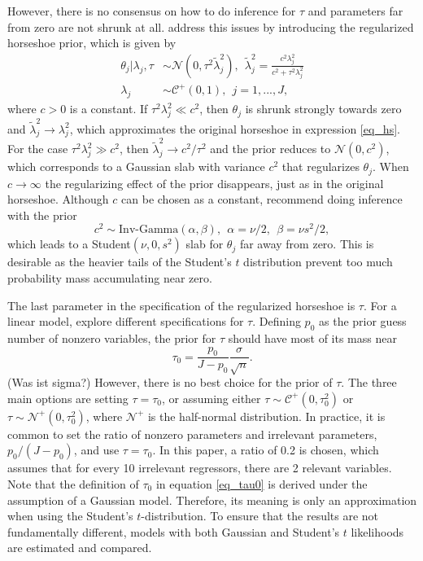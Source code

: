 However, there is no consensus on how to do inference for $\tau$ and parameters far from zero are not shrunk at all.
\cite{piironen_sparsity_2017} address this issues by introducing the regularized horseshoe prior, which is given by
\begin{equation}
    \begin{split}
        \theta_j | \lambda_j, \tau & \sim \mathcal N (0, \tau^2 \tilde \lambda^2_j),
        ~~ \tilde \lambda_j^2 = \displaystyle \frac{c^2 \lambda^2_j}{c^2 + \tau^2 \lambda_j^2}\\
        \lambda_j & \sim \mathcal C^+ (0, 1), ~~ j = 1,..., J,
    \end{split}
\end{equation}
where $c > 0$ is a constant.
If $\tau^2\lambda^2_j \ll c^2$, then $\theta_j$ is shrunk strongly towards zero and $\tilde \lambda^2_j \rightarrow \lambda^2_j$, which approximates the original horseshoe in expression \ref{eq_hs}.
For the case $\tau^2\lambda^2_j \gg c^2$, then $\tilde \lambda^2_j \rightarrow c^2/\tau^2$ and the prior reduces to $\mathcal N(0, c^2)$, which corresponds to a Gaussian slab with variance $c^2$ that regularizes $\theta_j$.
When $c \rightarrow \infty$ the regularizing effect of the prior disappears, just as in the original horseshoe.
Although $c$ can be chosen as a constant, \cite{piironen_sparsity_2017} recommend doing inference with the prior
\begin{equation*}
    c^2 \sim \text{Inv-Gamma}(\alpha, \beta), ~~ \alpha = \nu/2, ~~ \beta = \nu s^2/2,
\end{equation*}
which leads to a Student$(\nu, 0, s^2)$ slab for $\theta_j$ far away from zero.
This is desirable as the heavier tails of the Student's $t$ distribution prevent too much probability mass accumulating near zero.

The last parameter in the specification of the regularized horseshoe is $\tau$.
For a linear model, \cite{piironen_sparsity_2017} explore different specifications for $\tau$.
Defining $p_0$ as the prior guess number of nonzero variables, the prior for $\tau$ should have most of its mass near
\begin{equation}
    \displaystyle \tau_0 = \frac{p_0}{J-p_0}\frac{\sigma}{\sqrt n}.
    \label{eq_tau0}
\end{equation}
(Was ist sigma?)
However, there is no best choice for the prior of $\tau$. The three main options are setting $\tau = \tau_0$, or assuming either $\tau \sim \mathcal C^+(0, \tau_0^2)$ or $\tau \sim \mathcal N^+(0, \tau_0^2)$, where $\mathcal{N^+}$ is the half-normal distribution.
In practice, it is common to set the ratio of nonzero parameters and irrelevant parameters, $p_0/(J - p_0)$, and use $\tau = \tau_0$.
In this paper, a ratio of 0.2 is chosen, which assumes that for every 10 irrelevant regressors, there are 2 relevant variables.
Note that the definition of $\tau_0$ in equation \ref{eq_tau0} is derived under the assumption of a Gaussian model.
Therefore, its meaning is only an approximation when using the Student's $t$-distribution.
To ensure that the results are not fundamentally different, models with both Gaussian and Student's $t$ likelihoods are estimated and compared.

